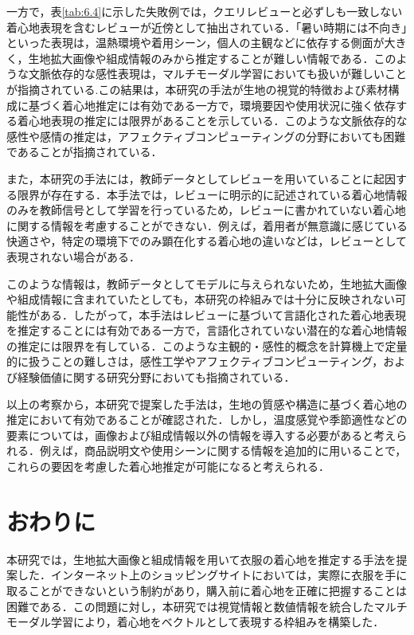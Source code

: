 \documentclass[a4paper,12pt]{jreport}
\begin{document}
一方で，表\ref{tab:6.4}に示した失敗例では，クエリレビューと必ずしも一致しない着心地表現を含むレビューが近傍として抽出されている．「暑い時期には不向き」といった表現は，温熱環境や着用シーン，個人の主観などに依存する側面が大きく，生地拡大画像や組成情報のみから推定することが難しい情報である．このような文脈依存的な感性表現は，マルチモーダル学習においても扱いが難しいことが指摘されている\cite{Baltrušaitis}\cite{Poria16}.この結果は，本研究の手法が生地の視覚的特徴および素材構成に基づく着心地推定には有効である一方で，環境要因や使用状況に強く依存する着心地表現の推定には限界があることを示している．このような文脈依存的な感性や感情の推定は，アフェクティブコンピューティングの分野においても困難であることが指摘されている\cite{Schuller}．

また，本研究の手法には，教師データとしてレビューを用いていることに起因する限界が存在する．本手法では，レビューに明示的に記述されている着心地情報のみを教師信号として学習を行っているため，レビューに書かれていない着心地に関する情報を考慮することができない．例えば，着用者が無意識に感じている快適さや，特定の環境下でのみ顕在化する着心地の違いなどは，レビューとして表現されない場合がある．

このような情報は，教師データとしてモデルに与えられないため，生地拡大画像や組成情報に含まれていたとしても，本研究の枠組みでは十分に反映されない可能性がある．したがって，本手法はレビューに基づいて言語化された着心地表現を推定することには有効である一方で，言語化されていない潜在的な着心地情報の推定には限界を有している．このような主観的・感性的概念を計算機上で定量的に扱うことの難しさは，感性工学やアフェクティブコンピューティング，および経験価値に関する研究分野においても指摘されている\cite{Ramachandram}\cite{Cer}\cite{Poria17}\cite{Schmitt}．

以上の考察から，本研究で提案した手法は，生地の質感や構造に基づく着心地の推定において有効であることが確認された．しかし，温度感覚や季節適性などの要素については，画像および組成情報以外の情報を導入する必要があると考えられる．例えば，商品説明文や使用シーンに関する情報を追加的に用いることで，これらの要因を考慮した着心地推定が可能になると考えられる．



        
\chapter{おわりに}
                
本研究では，生地拡大画像と組成情報を用いて衣服の着心地を推定する手法を提案した．インターネット上のショッピングサイトにおいては，実際に衣服を手に取ることができないという制約があり，購入前に着心地を正確に把握することは困難である．この問題に対し，本研究では視覚情報と数値情報を統合したマルチモーダル学習により，着心地をベクトルとして表現する枠組みを構築した．
\end{document}
